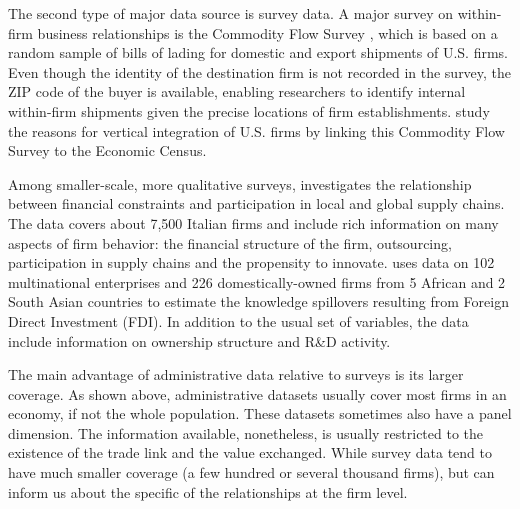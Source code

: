 \usepackage{}\documentclass[final, dvipsnames, authoryear,12pt]{elsarticle}
\begin{document}


The second type of major data source is survey data. A major survey on within-firm business relationships is the Commodity Flow Survey \cite{CFS}, which is based on a random sample of bills of lading for domestic and export shipments of U.S. firms. Even though the identity of the destination firm is not recorded in the survey, the ZIP code of the buyer is available, enabling researchers to identify internal within-firm shipments given the precise locations of firm establishments. \cite{atalay2014vertical} study the reasons for vertical integration of U.S. firms by linking this Commodity Flow Survey to the Economic Census.  


Among smaller-scale, more qualitative surveys, \cite{minetti2018financial} investigates the relationship between financial constraints and participation in local and global supply chains. The data covers about 7,500 Italian firms and include rich information on many aspects of firm behavior: the financial structure of the firm, outsourcing, participation in supply chains and the propensity to innovate. \cite{newman2018linked}  uses data on 102 multinational enterprises and 226 domestically-owned firms from 5 African and 2 South Asian countries to estimate the knowledge spillovers resulting from Foreign Direct Investment (FDI). In addition to the usual set of variables, the data include information on ownership structure and R\&D activity.

The main advantage of administrative data relative to surveys is its larger coverage. As shown above, administrative datasets usually cover most firms in an economy, if not the whole population. These datasets sometimes also have a panel dimension. The information available, nonetheless, is usually restricted to the existence of the trade link and the value exchanged. While survey data tend to have much smaller coverage (a few hundred or several thousand firms), but can inform us about the specific of the relationships at the firm level.



\end{document}
